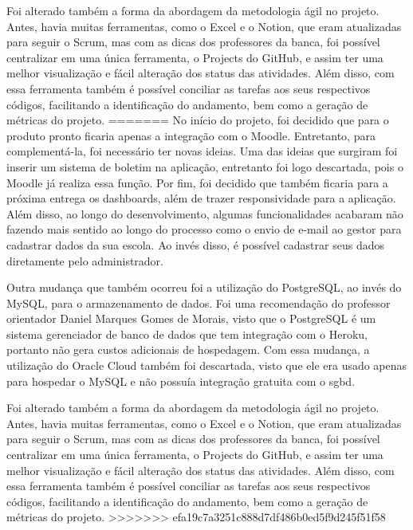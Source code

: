 Foi alterado também a forma da abordagem da metodologia ágil no projeto. Antes, havia muitas ferramentas, como o Excel e o Notion, que eram atualizadas para seguir o Scrum, mas com as dicas dos professores da banca, foi possível centralizar em uma única ferramenta, o Projects do GitHub, e assim ter uma melhor visualização e fácil alteração dos status das atividades. Além disso, com essa ferramenta também é possível conciliar as tarefas aos seus respectivos códigos, facilitando a identificação do andamento, bem como a geração de métricas do projeto.
=======
No início do projeto, foi decidido que para o produto pronto ficaria apenas a integração com o Moodle. Entretanto, para complementá-la, foi necessário ter novas ideias. Uma das ideias que surgiram foi inserir um sistema de boletim na aplicação, entretanto foi logo descartada, pois o Moodle já realiza essa função. Por fim, foi decidido que também ficaria para a próxima entrega os dashboards, além de trazer responsividade para a aplicação. Além disso, ao longo do desenvolvimento, algumas funcionalidades acabaram não fazendo mais sentido ao longo do processo como o envio de e-mail ao gestor para cadastrar dados da sua escola. Ao invés disso, é possível cadastrar seus dados diretamente pelo administrador. 

Outra mudança que também ocorreu foi a utilização do PostgreSQL, ao invés do MySQL, para o armazenamento de dados. Foi uma recomendação do professor orientador Daniel Marques Gomes de Morais, visto que o PostgreSQL é um sistema gerenciador de banco de dados que tem integração com o Heroku, portanto não gera custos adicionais de hospedagem. Com essa mudança, a utilização do Oracle Cloud também foi descartada, visto que ele era usado apenas para hospedar o MySQL e não possuía integração gratuita com o \ac{sgbd}.

Foi alterado também a forma da abordagem da metodologia ágil no projeto. Antes, havia muitas ferramentas, como o Excel e o Notion, que eram atualizadas para seguir o Scrum, mas com as dicas dos professores da banca, foi possível centralizar em uma única ferramenta, o Projects do GitHub, e assim ter uma melhor visualização e fácil alteração dos status das atividades. Além disso, com essa ferramenta também é possível conciliar as tarefas aos seus respectivos códigos, facilitando a identificação do andamento, bem como a geração de métricas do projeto.
>>>>>>> efa19c7a3251c888d7df486b0ed5f9d245f51f58
